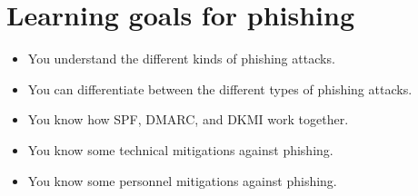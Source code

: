 \section{Learning goals for phishing}

\begin{itemize}
    \item You understand the different kinds of phishing attacks.
    \item You can differentiate between the different types of phishing attacks.
    \item You know how SPF, DMARC, and DKMI work together.
    \item You know some technical mitigations against phishing.
    \item You know some personnel mitigations against phishing.    
\end{itemize}